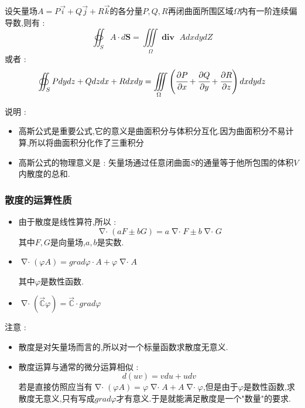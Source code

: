 \documentclass[UTF8,12pt]{ctexbook}
\newcommand{\mathConstant}{\mathbb{C}}
\newcommand{\partialDerivativeFrac}[2]{\cfrac{\partial #1}{\partial #2}}
\newcommand{\tripleIntegralOnZone}[1]{\iiint\limits_{#1}}
\newcommand{\doubleCurveIntegralOnZone}[1]{\oiint_{#1}}
\DeclareMathOperator{\divergenceText}{\mathbf{div}\ }
\DeclareMathOperator{\divergenceSymbol}{\nabla\cdot}
\begin{document}
{{{{{      设矢量场$A = P\vec{i} + Q\vec{j} + R\vec{k}$的各分量$P,Q,R$再闭曲面所围区域$\Omega$内有一阶连续偏导数,则有 :
      $$
        \doubleCurveIntegralOnZone{S}A \cdot d\mathbf{S} = \tripleIntegralOnZone{\Omega}\divergenceText AdxdydZ
      $$
      或者 :
      $$
        \doubleCurveIntegralOnZone{S}Pdydz + Qdzdx + Rdxdy = \tripleIntegralOnZone{\Omega}\left(\partialDerivativeFrac{P}{x} + \partialDerivativeFrac{Q}{y} + \partialDerivativeFrac{R}{z}\right)dxdydz
      $$

      说明 :
      \begin{itemize}
        \item {
              高斯公式是重要公式,它的意义是曲面积分与体积分互化.因为曲面积分不易计算,所以将曲面积分化作了三重积分
              }
        \item {
              高斯公式的物理意义是 : 矢量场通过任意闭曲面$S$的通量等于他所包围的体积$V$内散度的总和.
              }
      \end{itemize}
    }%

    \subsubsection{散度的运算性质}{
      \begin{itemize}
        \item {
              由于散度是线性算符,所以 :
              $$
                \divergenceSymbol(aF \pm bG) = a\divergenceSymbol F \pm b\divergenceSymbol G
              $$
              其中$F,G$是向量场,$a,b$是实数.
              }
        \item {
              $\divergenceSymbol(\varphi A) = grad \varphi \cdot A + \varphi\divergenceSymbol A$

              其中$\varphi$是数性函数.
              }
        \item {
              $\divergenceSymbol (\vec{\mathConstant}\varphi) = \vec{\mathConstant} \cdot grad \varphi$
              }
      \end{itemize}

      注意 :
      \begin{itemize}
        \item 散度是对矢量场而言的,所以对一个标量函数求散度无意义.
        \item {
              散度运算与通常的微分运算相似 :
              $$
                d(uv) = vdu + udv
              $$
              若是直接仿照应当有$\divergenceSymbol (\varphi A) = \varphi\divergenceSymbol A + A\divergenceSymbol \varphi$,但是由于$\varphi$是数性函数,求散度无意义,只有写成$grad \varphi$才有意义.于是就能满足散度是一个"数量"的要求.
              }
      \end{itemize}
    }%

}}}}
\end{document}
